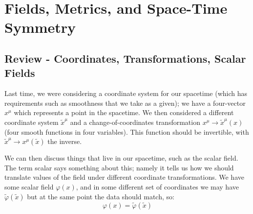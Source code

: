 \section{Fields, Metrics, and Space-Time Symmetry}
\subsection{Review - Coordinates, Transformations, Scalar Fields}
Last time, we were considering a coordinate system for our spacetime (which has requirements such as smoothness that we take as a given); we have a four-vector $x^\mu$ which represents a point in the spacetime. We then considered a different coordinate system $\tilde{x}^\mu$ and a change-of-coordinates transformation $x^\mu \to \tilde{x}^\mu(x)$ (four smooth functions in four variables). This function should be invertible, with $\tilde{x}^\mu \to x^\mu(\tilde{x})$ the inverse.

We can then discuss things that live in our spacetime, such as the scalar field. The term scalar says something about this; namely it tells us how we should translate values of the field under different coordinate transformations. We have some scalar field $\varphi(x)$, and in some different set of coordinates we may have $\tilde{\varphi}(\tilde{x})$ but at the same point the data should match, so:
\begin{equation}
    \varphi(x) = \tilde{\varphi}(\tilde{x})
\end{equation}

